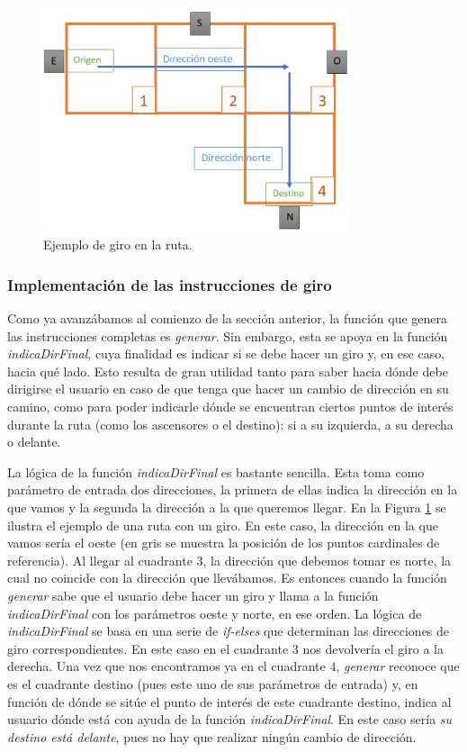 \begin{figure}[t]
	\centering
	\includegraphics[width=0.8\textwidth]{Imagenes/Capitulo4/simulacion_giro}
	\caption{Ejemplo de giro en la ruta.}
	\label{fig:simulacion_giro}
\end{figure}


\subsubsection{Implementación de las instrucciones de giro}
\label{sub:instr_giro}

Como ya avanzábamos al comienzo de la sección anterior, la función que genera las instrucciones completas es \textit{generar}. Sin embargo, esta se apoya en la función \textit{indicaDirFinal}, cuya finalidad es indicar si se debe hacer un giro y, en ese caso, hacia qué lado. Esto resulta de gran utilidad tanto para saber hacia dónde debe dirigirse el usuario en caso de que tenga que hacer un cambio de dirección en su camino, como para poder indicarle dónde se encuentran ciertos puntos de interés durante la ruta (como los ascensores o el destino): si a su izquierda, a su derecha o delante.

La lógica de la función \textit{indicaDirFinal} es bastante sencilla. Esta toma como parámetro de entrada dos direcciones, la primera de ellas indica la dirección en la que vamos y la segunda la dirección a la que queremos llegar. En la Figura \ref{fig:simulacion_giro} se ilustra el ejemplo de una ruta con un giro. En este caso, la dirección en la que vamos sería el oeste (en gris se muestra la posición de los puntos cardinales de referencia). Al llegar al cuadrante $3$, la dirección que debemos tomar es norte, la cual no coincide con la dirección que llevábamos. Es entonces cuando la función \textit{generar} sabe que el usuario debe hacer un giro y llama a la función \textit{indicaDirFinal} con los parámetros oeste y norte, en ese orden. La lógica de \textit{indicaDirFinal} se basa en una serie de \textit{if-elses} que determinan las direcciones de giro correspondientes. En este caso en el cuadrante $3$ nos devolvería el giro a la derecha. Una vez que nos encontramos ya en el cuadrante $4$, \textit{generar} reconoce que es el cuadrante destino (pues este uno de sus parámetros de entrada) y, en función de dónde se sitúe el punto de interés de este cuadrante destino, indica al usuario dónde está con ayuda de la función \textit{indicaDirFinal}. En este caso sería \textit{su destino está delante}, pues no hay que realizar ningún cambio de dirección. 

